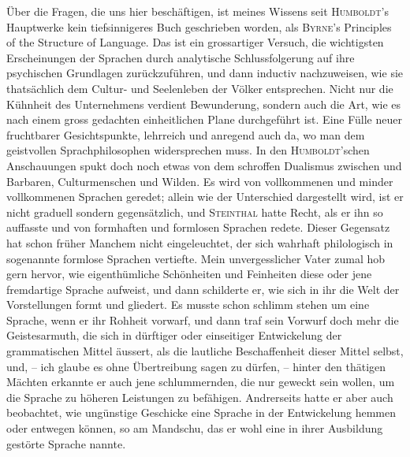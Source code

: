 Über die Fragen, die uns hier beschäftigen, ist meines Wissens seit \textsc{Humboldt}’s Hauptwerke kein tiefsinnigeres Buch geschrieben worden, als \textsc{Byrne}’s Principles of the Structure of Language. Das ist ein grossartiger Versuch, die wichtigsten Erscheinungen der Sprachen durch analytische Schlussfolgerung auf ihre psychischen Grundlagen zurückzuführen, und dann inductiv nachzuweisen, wie sie thatsächlich dem Cultur- und Seelenleben der Völker entsprechen. Nicht nur die Kühnheit  des Unternehmens verdient Bewunderung, sondern auch die Art, wie es nach einem gross gedachten einheitlichen Plane durchgeführt ist. Eine Fülle neuer fruchtbarer Gesichtspunkte, lehrreich und anregend auch da, wo man dem geistvollen Sprachphilosophen widersprechen muss. In \label{sp.427} den \textsc{Humboldt}’schen Anschauungen spukt doch noch etwas von dem schroffen Dualismus zwischen  und Barbaren, Culturmenschen und Wilden. Es wird von vollkommenen und minder vollkommenen Sprachen geredet; allein wie der Unterschied dargestellt wird, ist er nicht graduell sondern gegensätzlich, und \textsc{Steinthal} hatte Recht, als er ihn so auffasste und von formhaften und formlosen Sprachen redete. Dieser Gegensatz hat schon früher Manchem nicht eingeleuchtet, der sich wahrhaft philologisch in sogenannte formlose Sprachen vertiefte. Mein unvergesslicher Vater zumal hob gern hervor, wie eigenthümliche Schönheiten und Feinheiten diese oder jene fremdartige Sprache aufweist, und dann schilderte er, wie sich in ihr die Welt der Vorstellungen formt und gliedert. Es musste schon schlimm stehen um eine Sprache, wenn er ihr Rohheit vorwarf, und dann traf sein Vorwurf doch mehr die Geistesarmuth, die sich in dürftiger oder einseitiger Entwickelung der grammatischen Mittel äussert, als die lautliche Beschaffenheit dieser Mittel selbst, und, – ich glaube es ohne Übertreibung sagen zu dürfen, – hinter den thätigen Mächten erkannte er auch jene schlummernden, die nur geweckt sein wollen, um die Sprache zu höheren Leistungen zu befähigen. Andrerseits hatte er aber auch beobachtet, wie ungünstige Geschicke eine Sprache in der Entwickelung hemmen oder entwegen können, so am Mandschu, das er wohl eine in ihrer Ausbildung gestörte Sprache nannte.

